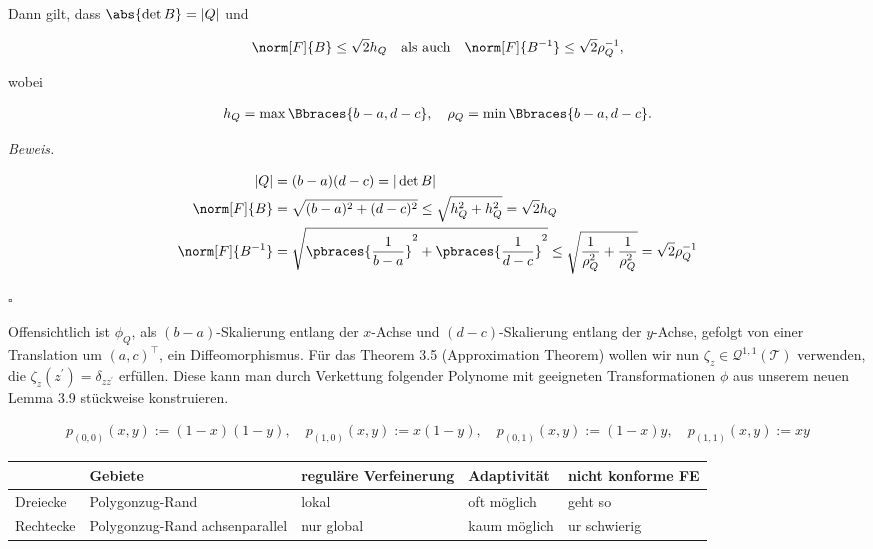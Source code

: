\begin{solution}
\begin{tcolorbox}[standard jigsaw, opacityback = 0]
  Dann gilt, dass $\abs{\det B} = |Q|$ und

  \begin{align*}
    \norm[F]{B} \leq \sqrt 2 h_Q
    \quad
    \text{als auch}
    \quad
    \norm[F]{B^{-1}} \leq \sqrt 2 \rho_Q^{-1},
  \end{align*}

  wobei

  \begin{align*}
    h_Q = \max \Bbraces{b - a, d - c},
    \quad
    \rho_Q = \min \Bbraces{b - a, d - c}.
  \end{align*}

\end{tcolorbox}

\textit{Beweis.}

\begin{align*}
  |Q| & = (b - a) (d - c) = |\det B| \\
  \norm[F]{B} & = \sqrt{(b - a)^2 + (d - c)^2} \leq \sqrt{h_Q^2 + h_Q^2} = \sqrt 2 h_Q \\
  \norm[F]{B^{-1}} & = \sqrt{\pbraces{\frac{1}{b - a}}^2 + \pbraces{\frac{1}{d - c}}^2} \leq \sqrt{\frac{1}{\rho_Q^2} + \frac{1}{\rho_Q^2}} = \sqrt 2 \rho_Q^{-1}
\end{align*}

\hfill
$\square$

Offensichtlich ist $\phi_Q$, als $(b - a)$-Skalierung entlang der $x$-Achse und $(d - c)$-Skalierung entlang der $y$-Achse, gefolgt von einer Translation um $(a, c)^\top$, ein Diffeomorphismus.
Für das Theorem 3.5 (Approximation Theorem) wollen wir nun $\zeta_z \in \mathcal{Q}^{1, 1}(\mathcal{T})$ verwenden, die $\zeta_z(z^\prime) = \delta_{z z^\prime}$ erfüllen.
Diese kann man durch Verkettung folgender Polynome mit geeigneten Transformationen $\phi$ aus unserem neuen Lemma 3.9 stückweise konstruieren.

\begin{align*}
  p_{(0, 0)}(x, y) := (1 - x) (1 - y),
  \quad
  p_{(1, 0)}(x, y) := x (1 - y),
  \quad
  p_{(0, 1)}(x, y) := (1 - x) y,
  \quad
  p_{(1, 1)}(x, y) := x y
\end{align*}

\begin{center}

  \small
  
  \begin{tabular}{l|l|l|l|l}
              & Gebiete                        & reguläre Verfeinerung & Adaptivität  & nicht konforme FE \\ \hline
    Dreiecke  & Polygonzug-Rand                & lokal                 & oft möglich  & geht so           \\
    Rechtecke & Polygonzug-Rand achsenparallel & nur global            & kaum möglich & ur schwierig      \\
  \end{tabular}

\end{center}

\end{solution}

